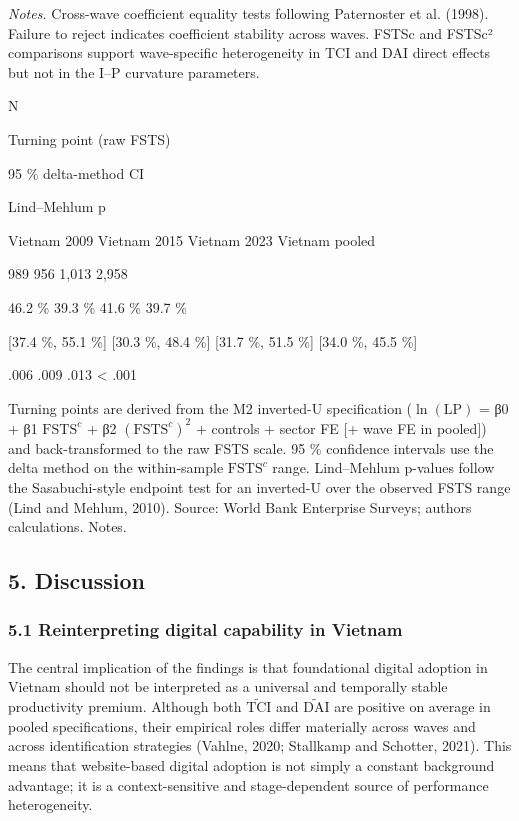 \documentclass[12pt,a4paper]{article}
\begin{document}
\emph{Notes.} Cross-wave coefficient equality tests following
Paternoster et al. (1998). Failure to reject indicates coefficient
stability across waves. FSTSc and FSTSc² comparisons support
wave-specific heterogeneity in TCI and DAI direct effects but not in the
I--P curvature parameters.

N

Turning point (raw FSTS)

95 \% delta-method CI

Lind--Mehlum p

Vietnam 2009 Vietnam 2015 Vietnam 2023 Vietnam pooled

989 956 1,013 2,958

46.2 \% 39.3 \% 41.6 \% 39.7 \%

{[}37.4 \%, 55.1 \%{]} {[}30.3 \%, 48.4 \%{]} {[}31.7 \%, 51.5 \%{]}
{[}34.0 \%, 45.5 \%{]}

.006 .009 .013 \textless{} .001

Turning points are derived from the M2 inverted-U specification
(\(\ln(\mathrm{LP})\) = β0 + β1 \(\mathrm{FSTS}^{c}\) + β2
\((\mathrm{FSTS}^{c})^2\) + controls + sector FE {[}+ wave FE in
pooled{]}) and back-transformed to the raw FSTS scale. 95 \% confidence
intervals use the delta method on the within-sample
\(\mathrm{FSTS}^{c}\) range. Lind--Mehlum p-values follow the
Sasabuchi-style endpoint test for an inverted-U over the observed FSTS
range (Lind and Mehlum, 2010). Source: World Bank Enterprise Surveys;
authors\textquotesingle{} calculations. Notes.

\hypertarget{5-discussion}{%
\subsection{5. Discussion}\label{5-discussion}}

\hypertarget{51-reinterpreting-digital-capability-in-vietnam}{%
\subsubsection{5.1 Reinterpreting digital capability in
Vietnam}\label{51-reinterpreting-digital-capability-in-vietnam}}

The central implication of the findings is that foundational digital
adoption in Vietnam should not be interpreted as a universal and
temporally stable productivity premium. Although both
\(\tilde{\mathrm{TCI}}\) and \(\tilde{\mathrm{DAI}}\) are positive on
average in pooled specifications, their empirical roles differ
materially across waves and across identification strategies (Vahlne,
2020; Stallkamp and Schotter, 2021). This means that website-based
digital adoption is not simply a constant background advantage; it is a
context-sensitive and stage-dependent source of performance
heterogeneity.
\end{document}
